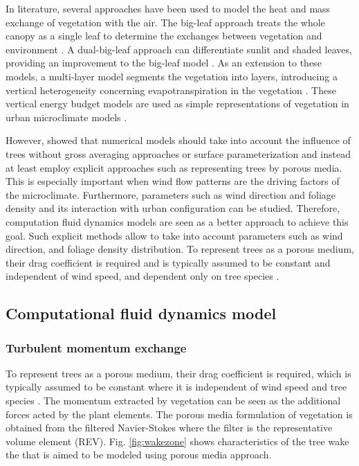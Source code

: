 In literature, several approaches have been used to model the heat and mass exchange of vegetation with the air. The big-leaf approach treats the whole canopy as a single leaf to determine the exchanges between vegetation and environment \citep{2861,Shuttleworth1985,Sellers1996}. A dual-big-leaf approach can differentiate sunlit and shaded leaves, providing an improvement to the big-leaf model \citep{Dai2004}. As an extension to these models, a multi-layer model segments the vegetation into layers, introducing a vertical heterogeneity concerning evapotranspiration in the vegetation \cite{Wang1990,Leuning1998}. These vertical energy budget models are used as simple representations of vegetation in urban microclimate models \citep{Dolman1993,Krayenhoff2014,Ryder2014}. 

However, \cite{HefnySalim2015} showed that numerical models should take into account the influence of trees without gross averaging approaches or surface parameterization and instead at least employ explicit approaches such as representing trees by porous media. This is especially important when wind flow patterns are the driving factors of the microclimate. Furthermore, parameters such as wind direction and foliage density and its interaction with urban configuration can be studied. Therefore, computation fluid dynamics models are seen as a better approach to achieve this goal. Such explicit methods allow to take into account parameters such as wind direction, and foliage density distribution. To represent trees as a porous medium, their drag coefficient is required and is typically assumed to be constant and independent of wind speed, and dependent only on tree species \citep{Wilson1977}. 

\subsection{Computational fluid dynamics model}

\subsubsection*{Turbulent momentum exchange}

To represent trees as a porous medium, their drag coefficient is required, which is typically assumed to be constant where it is independent of wind speed and tree species \citep{Wilson1977}. The momentum extracted by vegetation can be seen as the additional forces acted by the plant elements. The porous media formulation of vegetation is obtained from the filtered Navier-Stokes where the filter is the representative volume element (REV). Fig. \ref{fig:wakezone} shows characteristics of the tree wake the that is aimed to be modeled using porous media approach. 

